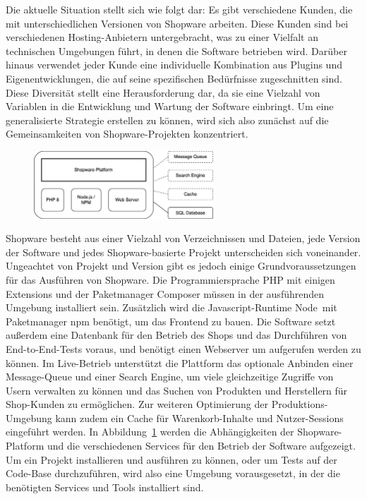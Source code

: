Die aktuelle Situation stellt sich wie folgt dar: Es gibt verschiedene Kunden, die mit unterschiedlichen Versionen von
Shopware arbeiten.
Diese Kunden sind bei verschiedenen Hosting-Anbietern untergebracht, was zu einer Vielfalt an technischen Umgebungen
führt, in denen die Software betrieben wird.
Darüber hinaus verwendet jeder Kunde eine individuelle Kombination aus Plugins und Eigenentwicklungen, die auf seine
spezifischen Bedürfnisse zugeschnitten sind.
Diese Diversität stellt eine Herausforderung dar, da sie eine Vielzahl von Variablen in die Entwicklung und Wartung der
Software einbringt.
Um eine generalisierte Strategie erstellen zu können, wird sich also zunächst auf die Gemeinsamkeiten von
Shopware-Projekten konzentriert.
\begin{figure}[H]
    \centering
    \includegraphics[width=0.6\textwidth]{images/content/shopware-requirements}
    \label{fig:shopware-requirements}
\end{figure}
Shopware besteht aus einer Vielzahl von Verzeichnissen und Dateien, jede Version der Software und jedes
Shopware-basierte Projekt unterscheiden sich voneinander.
Ungeachtet von Projekt und Version gibt es jedoch einige Grundvoraussetzungen für das Ausführen von Shopware.
Die Programmiersprache PHP mit einigen Extensions und der Paketmanager Composer müssen in der ausführenden Umgebung
installiert sein.
Zusätzlich wird die Javascript-Runtime \glqq Node\grqq\ mit Paketmanager \acrshort{npm} benötigt, um das Frontend zu
bauen.
Die Software setzt außerdem eine Datenbank für den Betrieb des Shops und das Durchführen von End-to-End-Tests voraus,
und benötigt einen Webserver um aufgerufen werden zu können.
Im Live-Betrieb unterstützt die Plattform das optionale Anbinden einer Message-Queue und einer Search Engine, um viele
gleichzeitige Zugriffe von Usern verwalten zu können und das Suchen von Produkten und Herstellern für Shop-Kunden zu
ermöglichen.
Zur weiteren Optimierung der Produktions-Umgebung kann zudem ein Cache für Warenkorb-Inhalte und Nutzer-Sessions
eingeführt werden.
In Abbildung\ \ref{fig:shopware-requirements} werden die Abhängigkeiten der Shopware-Platform und die verschiedenen
Services für den Betrieb der Software aufgezeigt.
Um ein Projekt installieren und ausführen zu können, oder um Tests auf der Code-Base durchzuführen, wird also eine
Umgebung vorausgesetzt, in der die benötigten Services und Tools installiert sind.

